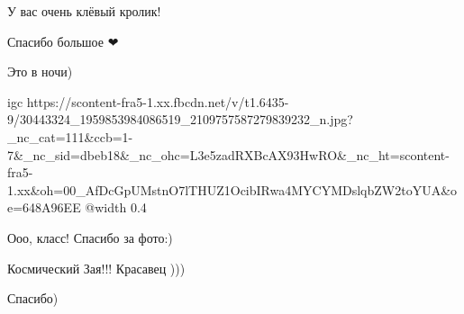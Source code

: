  
 
 
 
 

\qqSecCmt


У вас очень клёвый кролик!

\begin{itemize} %
Спасибо большое ❤
\end{itemize} %


Это в ночи)

\ifcmt
  igc https://scontent-fra5-1.xx.fbcdn.net/v/t1.6435-9/30443324_1959853984086519_2109757587279839232_n.jpg?_nc_cat=111&ccb=1-7&_nc_sid=dbeb18&_nc_ohc=L3e5zadRXBcAX93HwRO&_nc_ht=scontent-fra5-1.xx&oh=00_AfDcGpUMstnO7lTHUZ1OcibIRwa4MYCYMDslqbZW2toYUA&oe=648A96EE
	@width 0.4
\fi

\begin{itemize} %
Ооо, класс! Спасибо за фото:)
\end{itemize} %


Космический Зая!!! Красавец )))

\begin{itemize} %
Спасибо)
\end{itemize} %
